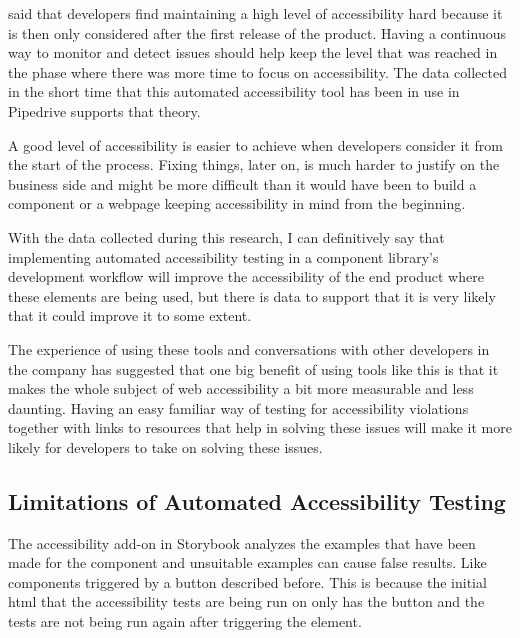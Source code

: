 \documentclass{master_thesis}
\begin{document}
\citeauthor{Paterno2020} said that developers find maintaining a high level of accessibility hard because it is then only considered after the first release of the product. Having a continuous way to monitor and detect issues should help keep the level that was reached in the phase where there was more time to focus on accessibility. The data collected in the short time that this automated accessibility tool has been in use in Pipedrive supports that theory.

A good level of accessibility is easier to achieve when developers consider it from the start of the process. Fixing things, later on, is much harder to justify on the business side and might be more difficult than it would have been to build a component or a webpage keeping accessibility in mind from the beginning.

With the data collected during this research, I can definitively say that implementing automated accessibility testing in a component library's development workflow will improve the accessibility of the end product where these elements are being used, but there is data to support that it is very likely that it could improve it to some extent.

The experience of using these tools and conversations with other developers in the company has suggested that one big benefit of using tools like this is that it makes the whole subject of web accessibility a bit more measurable and less daunting. Having an easy familiar way of testing for accessibility violations together with links to resources that help in solving these issues will make it more likely for developers to take on solving these issues.

\subsection{Limitations of Automated Accessibility Testing}


The accessibility add-on in Storybook analyzes the examples that have been made for the component and unsuitable examples can cause false results. Like components triggered by a button described before. This is because the initial \ac{html} that the accessibility tests are being run on only has the button and the tests are not being run again after triggering the element.
\end{document}
